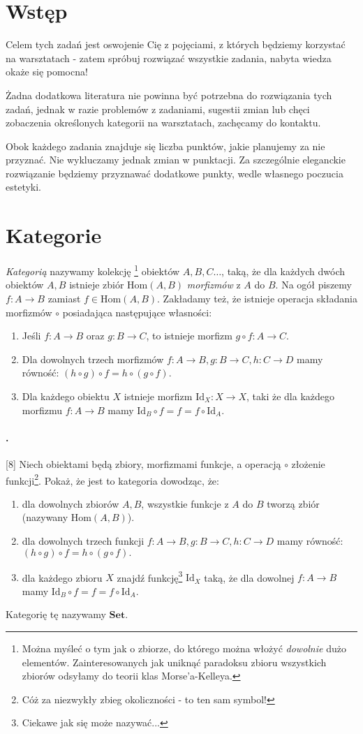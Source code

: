 \documentclass{article}
\newcounter{itemnum}
\newenvironment{prob}
{\stepcounter{itemnum}
\paragraph*{\arabic{itemnum}.}}
{~\newline}
\newcommand{\Hom}{\text{Hom}}
\newcommand{\Id}{\text{Id}}
\newcommand{\Set}{\textbf{Set}}
\begin{document}
\section{Wstęp}
  Celem tych zadań jest oswojenie Cię z pojęciami, z których będziemy korzystać na warsztatach - zatem spróbuj rozwiązać wszystkie zadania, nabyta wiedza okaże się pomocna!

  Żadna dodatkowa literatura nie powinna być potrzebna do rozwiązania tych zadań, jednak w razie problemów z zadaniami, sugestii zmian lub chęci zobaczenia określonych kategorii na warsztatach, zachęcamy do kontaktu.

  Obok każdego zadania znajduje się liczba punktów, jakie planujemy za nie przyznać. Nie wykluczamy jednak zmian w punktacji. Za szczególnie eleganckie rozwiązanie będziemy przyznawać dodatkowe punkty, wedle własnego poczucia estetyki.

\section{Kategorie}
\emph{Kategorią} nazywamy kolekcję
\footnote{Można myśleć o tym jak o zbiorze, do którego można włożyć \emph{dowolnie} dużo elementów. Zainteresowanych jak uniknąć paradoksu zbioru wszystkich zbiorów odsyłamy do teorii klas Morse'a-Kelleya.}
obiektów $A, B, C\dots$, taką, że dla każdych dwóch obiektów $A, B$ istnieje zbiór $\Hom(A, B)$ \textit{morfizmów} z $A$ do $B$. Na ogół piszemy $f:A\to B$ zamiast $f\in \Hom(A,B)$. Zakładamy też, że istnieje operacja składania morfizmów $\circ$ posiadająca następujące własności:
\begin{enumerate}
  \item Jeśli $f:A\to B$ oraz $g: B\to C$, to istnieje morfizm $g\circ f: A\to C$.
  \item Dla dowolnych trzech morfizmów $f:A\to B, g:B\to C, h:C\to D$ mamy równość: $(h\circ g)\circ f = h\circ(g\circ f).$
  \item Dla każdego obiektu $X$ istnieje morfizm $\Id_X: X\to X$, taki że dla każdego morfizmu $f:A\to B$ mamy $\Id_B\circ f=f=f\circ\Id_A$.
\end{enumerate}

\begin{prob}
  [8] Niech obiektami będą zbiory, morfizmami funkcje, a operacją $\circ$ złożenie funkcji\footnote{Cóż za niezwykły zbieg okoliczności - to ten sam symbol!}. Pokaż, że
  jest to kategoria dowodząc, że:
  \begin{enumerate}
    \item dla dowolnych zbiorów $A, B$, wszystkie funkcje z $A$ do $B$ tworzą zbiór (nazywany $\Hom(A,B)$).
    \item dla dowolnych trzech funkcji $f:A\to B, g:B\to C, h:C\to D$ mamy równość: $(h\circ g)\circ f = h\circ(g\circ f).$
    \item dla każdego zbioru $X$ znajdź funkcję\footnote{Ciekawe jak się może nazywać...} $\Id_X$ taką, że dla dowolnej $f:A\to B$ mamy $\Id_B\circ f=f=f\circ\Id_A$.
  \end{enumerate}
  Kategorię tę nazywamy $\Set$.
\end{prob}
\end{document}
